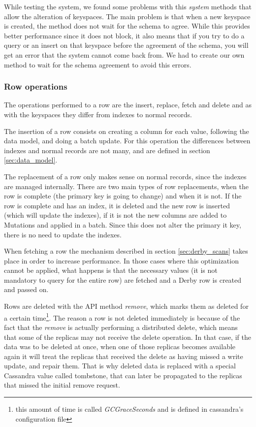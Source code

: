 While testing the system, we found some problems with this \emph{system} methods that allow the alteration of keyspaces. The main problem is that when a new keyspace is created, the method does not wait for the schema to agree. While this provides better performance since it does not block, it also means that if you try to do a query or an insert on that keyspace before the agreement of the schema, you will get an error that the system cannot come back from. We had to create our own method to wait for the schema agreement to avoid this errors.      

\subsubsection{Row operations}
The operations performed to a row are the insert, replace, fetch and delete and as with the keyspaces they differ from indexes to normal records.

The insertion of a row consists on creating a column for each value, following the data model, and doing a batch update. For this operation the differences between indexes and normal records are not many, and are defined in section \ref{sec:data_model}. 

The replacement of a row only makes sense on normal records, since the indexes are managed internally. There are two main types of row replacements, when the row is complete (the primary key is going to change) and when it is not. If the row is complete and has an index, it is deleted and the new row is inserted (which will update the indexes), if it is not the new columns are added to Mutations and applied in a batch. Since this does not alter the primary it key, there is no need to update the indexes.

When fetching a row the mechanism described in section \ref{sec:derby_scans} takes place in order to increase performance. In those cases where this optimization cannot be applied, what happens is that the necessary values (it is not mandatory to query for the entire row) are fetched and a Derby row is created and passed on.  

Rows are deleted with the API method \emph{remove}, which marks them as deleted for a certain time\footnote{this amount of time is called \emph{GCGraceSeconds} and is defined in cassandra's configuration file}. The reason a row is not deleted immediately is because of the fact that the \emph{remove} is actually performing a distributed delete, which means that some of the replicas may not receive the delete operation. In that case, if the data was to be deleted at once, when one of those replicas becomes available again it will treat the replicas that received the delete as having missed a write update, and repair them. That is why deleted data is replaced with a special Cassandra value called tombstone, that can later be propagated to the replicas that missed the initial remove request.

